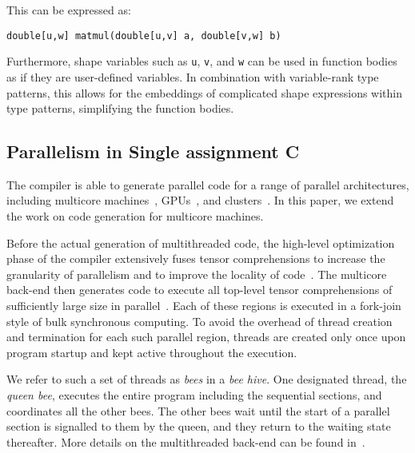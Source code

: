This can be expressed as:
\begin{verbatim}
double[u,w] matmul(double[u,v] a, double[v,w] b)
\end{verbatim}

Furthermore, shape variables such as \verb|u|, \verb|v|, and \verb|w| can be used in function bodies
as if they are user-defined variables. In combination with variable-rank type patterns, this allows
for the embeddings of complicated shape expressions within type patterns, simplifying the function
bodies.

\subsection{Parallelism in Single assignment C}\label{sac-par}

The \sac{} compiler is able to generate parallel code for a range of parallel architectures,
including multicore machines~\cite{sac-shared}, GPUs~\cite{sac-gpu,sac-gpu2}, and
clusters~\cite{sac-mpi}. In this paper, we extend the work on code generation for multicore
machines.

Before the actual generation of multithreaded code, the high-level optimization phase of the
compiler extensively fuses tensor comprehensions to increase the granularity of parallelism and to
improve the locality of code~\cite{sac1}. The multicore back-end then generates code to execute all
top-level tensor comprehensions of sufficiently large size in parallel~\cite{sac-shared}. Each of
these regions is executed in a fork-join style of bulk synchronous computing. To avoid the overhead
of thread creation and termination for each such parallel region, threads are created only once upon
program startup and kept active throughout the execution.

We refer to such a set of threads as \textit{bees} in a \textit{bee hive}. One designated thread,
the \textit{queen bee}, executes the entire program including the sequential sections, and
coordinates all the other bees. The other bees wait until the start of a parallel section is
signalled to them by the queen, and they return to the waiting state thereafter. More details on the
multithreaded back-end can be found in~\cite{sac-shared}.
